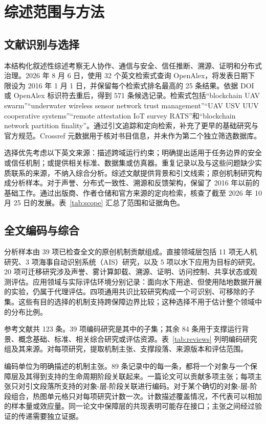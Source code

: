 \section{综述范围与方法}\label{sec:scope}
\subsection{文献识别与选择}

本结构化叙述性综述考察无人协作、通信与安全、信任推断、溯源、证明和分布式治理。2026 年 8 月 6 日，使用 32 个英文检索式查询 OpenAlex，将发表日期下限设为 2016 年 1 月 1 日，并保留每个检索式排名最高的 25 条结果。依据 DOI 或 OpenAlex 标识符去重后，得到 571 条候选记录。检索式包括“blockchain UAV swarm”“underwater wireless sensor network trust management”“UAV USV UUV cooperative systems”“remote attestation IoT survey RATS”和“blockchain network partition finality”。通过引文追踪和定向检索，补充了更早的基础研究与官方规范。Crossref 元数据用于核对书目信息，并未作为第二个独立筛选数据库。

选择优先考虑以下英文来源：描述跨域运行约束；明确提出适用于任务边界的安全或信任机制；或提供相关标准、数据集或仿真器。重复记录以及与这些问题缺少实质联系的来源，不纳入综合分析。综述文献提供背景和引文线索；原创机制研究构成分析样本。对于声誉、分布式一致性、溯源和反馈架构，保留了 2016 年以前的基础工作。通过出版商、作者仓储和官方来源的定向检索，核查了截至 2026 年 10 月 25 日的发展。表~\ref{tab:scope} 汇总了范围和证据角色。

\subsection{全文编码与综合}\label{sec:coding}

分析样本由 39 项已检查全文的原创机制贡献组成。直接领域层包括 11 项无人机研究、3 项海事自动识别系统（AIS）研究，以及 5 项以水下应用为目标的研究。20 项可迁移研究涉及声誉、雾计算卸载、溯源、证明、访问控制、共享状态或观测评估。应用领域与实际评估环境分别记录：面向水下用途、但使用陆地数据开展的实验，仍属于代理评估。四项通用共识比较研究构成一个可识别、可移除的子集。这些有目的选择的机制支持跨保障边界比较；这种选择不用于估计整个领域中的分布比例。

参考文献共 123 条。39 项编码研究是其中的子集；其余 84 条用于支撑运行背景、概念基础、标准、相关综合研究或评估资源。表~\ref{tab:reviews} 列明编码研究组及其来源。对每项研究，提取机制主张、支撑段落、来源版本和评估范围。

编码单位为明确描述的机制主张。89 条记录中的每一条，都将一个对象与一个保障层及其得到支持的生命周期阶段关联起来。一篇论文可以贡献多项主张；每项主张只对引文段落所支持的对象-层-阶段关联进行编码。对于某个确切的对象-层-阶段组合，热图单元格只对每项研究计数一次。计数描述覆盖情况，不代表可以相加的样本量或效应量。同一论文中保障层的共现表明可能存在接口；主张之间经过验证的传递需要独立证据。

